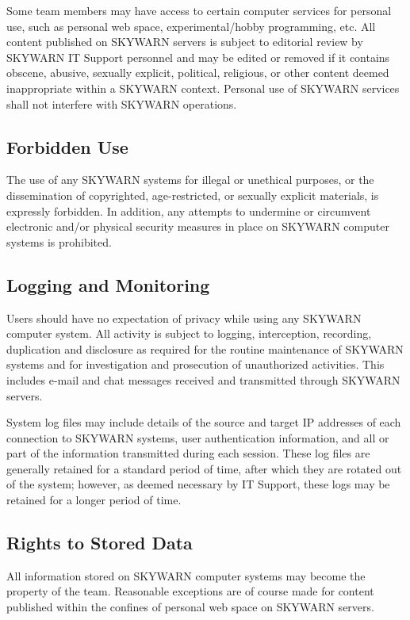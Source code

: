 \documentclass[pdflatex,letterpaper,twoside,12pt]{book}
\begin{document}
Some team members may have access to certain computer services for personal use, such as personal web space, experimental/hobby programming, etc.  All content published on SKYWARN servers is subject to editorial review by SKYWARN IT Support personnel and may be edited or removed if it contains obscene, abusive, sexually explicit, political, religious, or other content deemed inappropriate within a SKYWARN context.  Personal use of SKYWARN services shall not interfere with SKYWARN operations.

\subsection{Forbidden Use}

The use of any SKYWARN systems for illegal or unethical purposes, or the dissemination of copyrighted, age-restricted, or sexually explicit materials, is expressly forbidden.  In addition, any attempts to undermine or circumvent electronic and/or physical security measures in place on SKYWARN computer systems is prohibited.

\subsection{Logging and Monitoring}

Users should have no expectation of privacy while using any SKYWARN computer system.  All activity is subject to logging, interception, recording, duplication and disclosure as required for the routine maintenance of SKYWARN systems and for investigation and prosecution of unauthorized activities.  This includes e-mail and chat messages received and transmitted through SKYWARN servers.

System log files may include details of the source and target IP addresses of each connection to SKYWARN systems, user authentication information, and all or part of the information transmitted during each session.  These log files are generally retained for a standard period of time, after which they are rotated out of the system; however, as deemed necessary by IT Support, these logs may be retained for a longer period of time.

\subsection{Rights to Stored Data}

All information stored on SKYWARN computer systems may become the property of the team.  Reasonable exceptions are of course made for content published within the confines of personal web space on SKYWARN servers.
\end{document}
